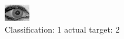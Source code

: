 \begin{figure}[h!]
\begin{center}
\includegraphics[width=0.60\columnwidth]{figures/ID2034_class_1_target_2.png}
\end{center}
\caption{ Classification: 1 actual target: 2}
\label{fig:ID2034_class_1_target_2}
\end{figure}
